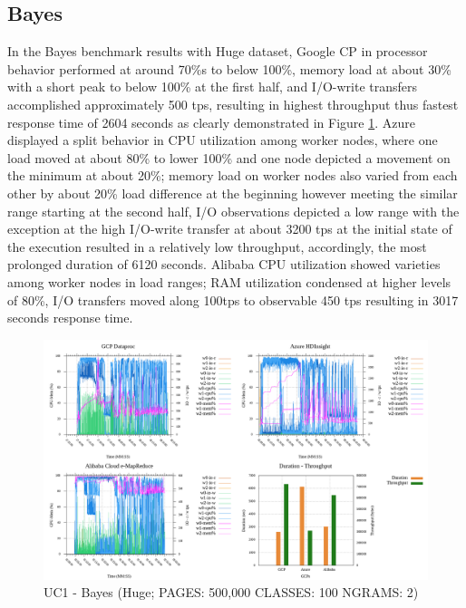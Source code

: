 \documentclass[review]{elsarticle}
\begin{document}
\subsection{Bayes}
In the Bayes benchmark results with Huge dataset, Google CP in processor behavior performed at around 70\%s to below 100\%, memory load at about 30\% with a short peak to below 100\% at the first half, and I/O-write transfers accomplished approximately 500 tps, resulting in highest throughput thus fastest response time of 2604 seconds as clearly demonstrated in Figure \ref{fig:uc1-bayes-h-cmidt}. Azure displayed a split behavior in CPU utilization among worker nodes, where one load moved at about 80\% to lower 100\% and one node depicted a movement on the minimum at about 20\%; memory load on worker nodes also varied from each other by about 20\% load difference at the beginning however meeting the similar range starting at the second half, I/O observations depicted a low range with the exception at the high I/O-write transfer at about 3200 tps at the initial state of the execution resulted in a relatively low throughput, accordingly, the most prolonged duration of 6120 seconds. Alibaba CPU utilization showed varieties among worker nodes in load ranges; RAM utilization condensed at higher levels of 80\%, I/O transfers moved along 100tps to observable 450 tps resulting in 3017 seconds response time.

\begin{figure}[p]
	\caption{UC1 - Bayes (Huge; PAGES: 500,000 CLASSES: 100 NGRAMS: 2)}
	\label{fig:uc1-bayes-h-cmidt}
	\includegraphics[width=\textwidth]{uc1-bayes-h-cmidt}
	\centering
\end{figure}
\end{document}
